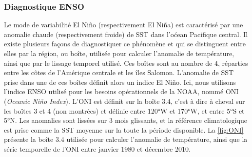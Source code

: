 \documentclass[../main.tex]{subfiles}
\begin{document}


\subsubsection{Diagnostique ENSO}\label{sec:diag_enso}

Le mode de variabilité El Niño (respectivement El Niña) est caractérisé par une anomalie chaude (respectivement froide) de SST dans l'oćean Pacifique central.
Il existe plusieurs façons de diagnostiquer ce phénomène et qui se distinguent entre elles par la région, ou boîte, utilisée pour calculer l'anomalie de
température, ainsi que par le lissage temporel utilisé. Ces boîtes sont au nombre de \num{4}, réparties entre les côtes de l'Amérique centrale et les îles
Salomon. L'anomalie de SST prise dans une de ces boîtes définit alors un indice El Niño. Ici, nous utilisons l'indice ENSO utilisé pour les besoins
opérationnels de la NOAA, nommé ONI (\textit{Oceanic Niño Index}). L'ONI est définit sur la boîte 3.4, c'est à dire à cheval sur les boîtes \num{3} et \num{4}
(non montrées) et définie entre \ang{120}W et \ang{170}W, et entre \ang{5}S et \ang{5}N. Les anomalies sont lissées sur \num{3} mois glissants, et la référence
climatologique est prise comme la SST moyenne sur la toute la période disponible. La \cref{fig:ONI} présente la boîte 3.4 utilisée pour calculer l'anomalie de
température, ainsi que la série temporelle de l'ONI entre janvier \num{1980} et décembre \num{2010}.
\end{document}
